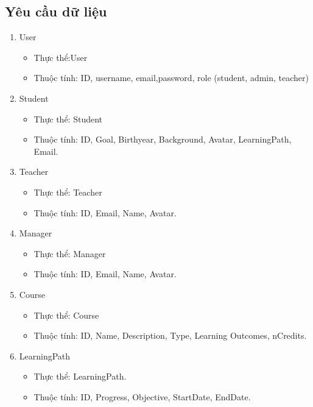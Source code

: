 \subsection{Yêu cầu dữ liệu}
\begin{enumerate}
    \item User
    \begin{itemize}
        \item Thực thể:User
        \item Thuộc tính: ID, username, email,password, role (student, admin, teacher)
    \end{itemize}
    \item Student
    \begin{itemize}
        \item Thực thể: Student
        \item Thuộc tính: ID, Goal, Birthyear, Background, Avatar, LearningPath, Email.
    \end{itemize}
    \item Teacher
    \begin{itemize}
        \item Thực thể: Teacher
        \item Thuộc tính: ID, Email, Name, Avatar.
    \end{itemize}
    \item Manager
    \begin{itemize}
        \item Thực thể: Manager
        \item Thuộc tính: ID, Email, Name, Avatar.
    \end{itemize}
    \item Course
    \begin{itemize}
        \item Thực thể: Course
        \item Thuộc tính: ID, Name, Description, Type, Learning Outcomes, nCredits.
    \end{itemize}
    \item LearningPath
    \begin{itemize}
        \item Thực thể: LearningPath.
        \item Thuộc tính: ID, Progress, Objective, StartDate, EndDate.
    \end{itemize}

\end{enumerate}
